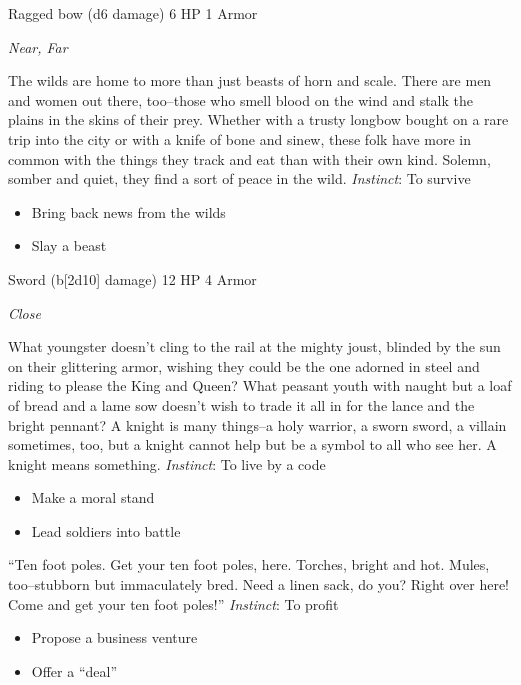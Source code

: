 Ragged bow (d6 damage)\hspace*{\fill} 6 HP 1 Armor

\emph{Near, Far}

\HRule
The wilds are home to more than just beasts of horn and scale. There are men and women out there, too--those who smell blood on the wind and stalk the plains in the skins of their prey. Whether with a trusty longbow bought on a rare trip into the city or with a knife of bone and sinew, these folk have more in common with the things they track and eat than with their own kind. Solemn, somber and quiet, they find a sort of peace in the wild. \emph{Instinct}: To survive
\begin{itemize}
\item Bring back news from the wilds
\item Slay a beast
\end{itemize}

\HRule
{}

Sword (b[2d10] damage)\hspace*{\fill} 12 HP 4 Armor

\emph{Close}

\HRule
What youngster doesn't cling to the rail at the mighty joust, blinded by the sun on their glittering armor, wishing they could be the one adorned in steel and riding to please the King and Queen? What peasant youth with naught but a loaf of bread and a lame sow doesn't wish to trade it all in for the lance and the bright pennant? A knight is many things--a holy warrior, a sworn sword, a villain sometimes, too, but a knight cannot help but be a symbol to all who see her. A knight means something. \emph{Instinct}: To live by a code
\begin{itemize}
\item Make a moral stand
\item Lead soldiers into battle
\end{itemize}
\newpage
\HRule
{} 

\HRule
``Ten foot poles. Get your ten foot poles, here. Torches, bright and hot. Mules, too--stubborn but immaculately bred. Need a linen sack, do you? Right over here! Come and get your ten foot poles!'' \emph{Instinct}: To profit
\begin{itemize}
\item Propose a business venture
\item Offer a ``deal''
\end{itemize}

